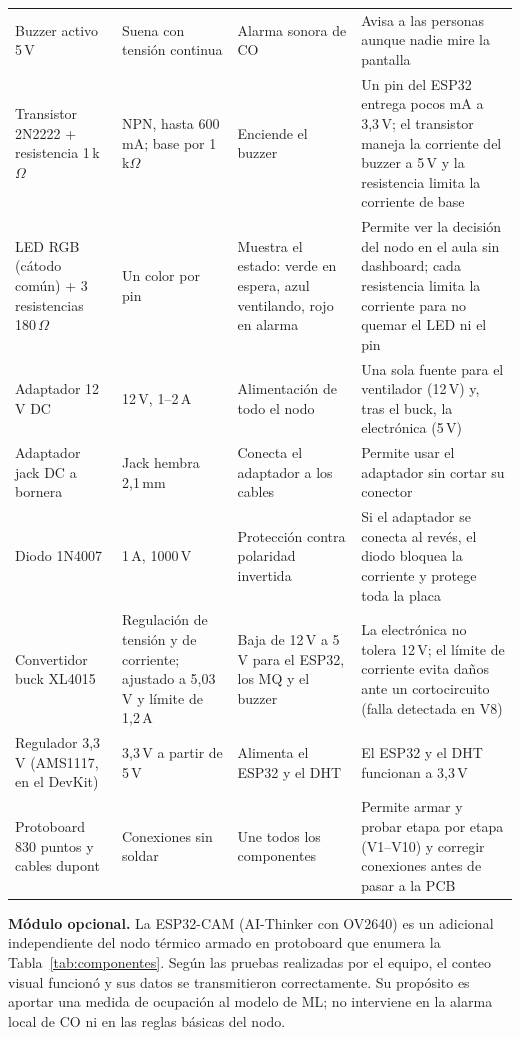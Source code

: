 \documentclass[10pt,a4paper]{article}
\begin{document}
\begin{table}[H]
\begin{tabularx}{\linewidth}{L{2.3cm}L{3.3cm}L{3.1cm}>{\raggedright\arraybackslash}X}
Buzzer activo 5\,V & Suena con tensión continua & Alarma sonora de CO & Avisa a las personas aunque nadie mire la pantalla \\
Transistor 2N2222 + resistencia 1\,k$\Omega$ & NPN, hasta 600\,mA; base por 1\,k$\Omega$ & Enciende el buzzer & Un pin del ESP32 entrega pocos mA a 3,3\,V; el transistor maneja la corriente del buzzer a 5\,V y la resistencia limita la corriente de base \\
LED RGB (cátodo común) + 3 resistencias 180\,$\Omega$ & Un color por pin & Muestra el estado: verde en espera, azul ventilando, rojo en alarma & Permite ver la decisión del nodo en el aula sin dashboard; cada resistencia limita la corriente para no quemar el LED ni el pin \\
Adaptador 12\,V DC & 12\,V, 1--2\,A & Alimentación de todo el nodo & Una sola fuente para el ventilador (12\,V) y, tras el buck, la electrónica (5\,V) \\
Adaptador jack DC a bornera & Jack hembra 2,1\,mm & Conecta el adaptador a los cables & Permite usar el adaptador sin cortar su conector \\
Diodo 1N4007 & 1\,A, 1000\,V & Protección contra polaridad invertida & Si el adaptador se conecta al revés, el diodo bloquea la corriente y protege toda la placa \\
Convertidor buck XL4015 & Regulación de tensión y de corriente; ajustado a 5,03\,V y límite de 1,2\,A & Baja de 12\,V a 5\,V para el ESP32, los MQ y el buzzer & La electrónica no tolera 12\,V; el límite de corriente evita daños ante un cortocircuito (falla detectada en V8) \\
Regulador 3,3\,V (AMS1117, en el DevKit) & 3,3\,V a partir de 5\,V & Alimenta el ESP32 y el DHT & El ESP32 y el DHT funcionan a 3,3\,V \\
Protoboard 830 puntos y cables dupont & Conexiones sin soldar & Une todos los componentes & Permite armar y probar etapa por etapa (V1--V10) y corregir conexiones antes de pasar a la PCB \\
\bottomrule
\end{tabularx}
\end{table}

\textbf{Módulo opcional.} La ESP32-CAM (AI-Thinker con OV2640) es un adicional independiente del nodo térmico armado en protoboard que enumera la Tabla~\ref{tab:componentes}. Según las pruebas realizadas por el equipo, el conteo visual funcionó y sus datos se transmitieron correctamente. Su propósito es aportar una medida de ocupación al modelo de ML; no interviene en la alarma local de CO ni en las reglas básicas del nodo.
\end{document}
